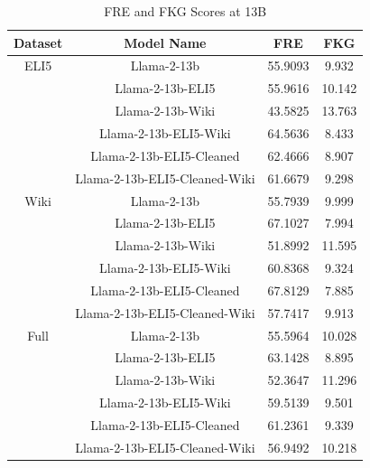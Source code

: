 \documentclass[11pt, oneside]{article}   	%
\begin{document}
\begin{table}[h]
\centering
\begin{tabular}{cccc}
\toprule
Dataset & Model Name & FRE & FKG \\
\midrule
ELI5 & Llama-2-13b & 55.9093 & 9.932 \\
 & Llama-2-13b-ELI5 & 55.9616 & 10.142 \\
 & Llama-2-13b-Wiki & 43.5825 & 13.763 \\
  & Llama-2-13b-ELI5-Wiki & 64.5636 & 8.433 \\
 & Llama-2-13b-ELI5-Cleaned & 62.4666 & 8.907 \\
 & Llama-2-13b-ELI5-Cleaned-Wiki & 61.6679 & 9.298 \\
\midrule
Wiki & Llama-2-13b & 55.7939 & 9.999 \\
 & Llama-2-13b-ELI5 & 67.1027 & 7.994 \\
 & Llama-2-13b-Wiki & 51.8992 & 11.595 \\
  & Llama-2-13b-ELI5-Wiki & 60.8368 & 9.324 \\
 & Llama-2-13b-ELI5-Cleaned & 67.8129 & 7.885 \\
 & Llama-2-13b-ELI5-Cleaned-Wiki & 57.7417 & 9.913 \\
 \midrule
Full & Llama-2-13b & 55.5964 & 10.028 \\
 & Llama-2-13b-ELI5 & 63.1428 & 8.895 \\
 & Llama-2-13b-Wiki & 52.3647 & 11.296 \\
  & Llama-2-13b-ELI5-Wiki & 59.5139 & 9.501 \\
 & Llama-2-13b-ELI5-Cleaned & 61.2361 & 9.339 \\
 & Llama-2-13b-ELI5-Cleaned-Wiki & 56.9492 & 10.218 \\
\bottomrule
\end{tabular}
\caption{FRE and FKG Scores at 13B}
\label{tab:FRE_FKG_13B}
\end{table}
\end{document}

